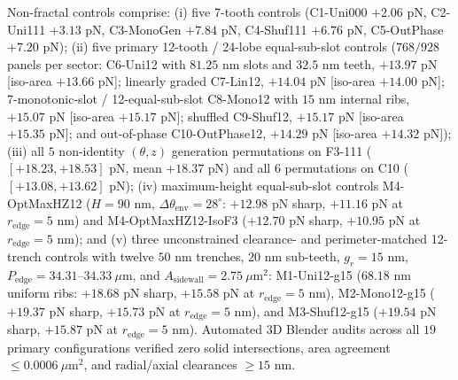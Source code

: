 \documentclass[11pt, a4paper]{article}
\begin{document}
Non-fractal controls comprise: (i) five 7-tooth controls (C1-Uni000 $+2.06\text{ pN}$, C2-Uni111 $+3.13\text{ pN}$, C3-MonoGen $+7.84\text{ pN}$, C4-Shuf111 $+6.76\text{ pN}$, C5-OutPhase $+7.20\text{ pN}$); (ii) five primary 12-tooth / 24-lobe equal-sub-slot controls ($768/928$ panels per sector: C6-Uni12 with $81.25\text{ nm}$ slots and $32.5\text{ nm}$ teeth, $+13.97\text{ pN}$ [iso-area $+13.66\text{ pN}$]; linearly graded C7-Lin12, $+14.04\text{ pN}$ [iso-area $+14.00\text{ pN}$]; 7-monotonic-slot / 12-equal-sub-slot C8-Mono12 with $15\text{ nm}$ internal ribs, $+15.07\text{ pN}$ [iso-area $+15.17\text{ pN}$]; shuffled C9-Shuf12, $+15.17\text{ pN}$ [iso-area $+15.35\text{ pN}$]; and out-of-phase C10-OutPhase12, $+14.29\text{ pN}$ [iso-area $+14.32\text{ pN}$]); (iii) all $5$ non-identity $(\theta, z)$ generation permutations on F3-111 ($[+18.23, +18.53]\text{ pN}$, mean $+18.37\text{ pN}$) and all $6$ permutations on C10 ($[+13.08, +13.62]\text{ pN}$); (iv) maximum-height equal-sub-slot controls M4-OptMaxHZ12 ($H=90\text{ nm}$, $\Delta\theta_{\mathrm{env}}=28^\circ$: $+12.98\text{ pN}$ sharp, $+11.16\text{ pN}$ at $r_{\mathrm{edge}}=5\text{ nm}$) and M4-OptMaxHZ12-IsoF3 ($+12.70\text{ pN}$ sharp, $+10.95\text{ pN}$ at $r_{\mathrm{edge}}=5\text{ nm}$); and (v) three unconstrained clearance- and perimeter-matched 12-trench controls with twelve $50\text{ nm}$ trenches, $20\text{ nm}$ sub-teeth, $g_r = 15\text{ nm}$, $P_{\mathrm{edge}} = 34.31\text{--}34.33\ \mu\text{m}$, and $A_{\mathrm{sidewall}} = 2.75\ \mu\text{m}^2$: M1-Uni12-g15 ($68.18\text{ nm}$ uniform ribs: $+18.68\text{ pN}$ sharp, $+15.58\text{ pN}$ at $r_{\mathrm{edge}}=5\text{ nm}$), M2-Mono12-g15 ($+19.37\text{ pN}$ sharp, $+15.73\text{ pN}$ at $r_{\mathrm{edge}}=5\text{ nm}$), and M3-Shuf12-g15 ($+19.54\text{ pN}$ sharp, $+15.87\text{ pN}$ at $r_{\mathrm{edge}}=5\text{ nm}$). Automated 3D Blender audits across all $19$ primary configurations verified zero solid intersections, area agreement $\le 0.0006\ \mu\text{m}^2$, and radial/axial clearances $\ge 15\text{ nm}$.
\end{document}
